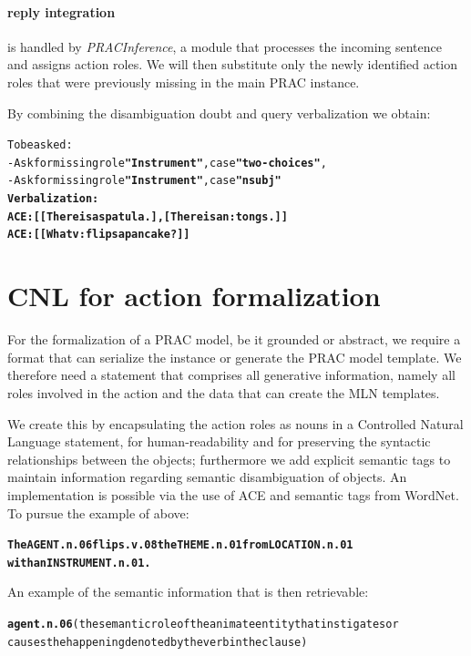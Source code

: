 \documentclass[oribibl]{llncs}
\begin{document}



\paragraph{reply integration} is handled by \textit{PRACInference}, a module that processes the incoming sentence and assigns action roles. We will then substitute only the newly identified action roles that were previously missing in the main PRAC instance.

By combining the disambiguation doubt and query verbalization we obtain:
\begin{alltt}
To be asked:
  - Ask for missing role \textbf{"Instrument"}, case \textbf{"two-choices"},
  - Ask for missing role \textbf{"Instrument"}, case \textbf{"nsubj"}  
\textbf{\color{red}
Verbalization: 
ACE: [[There is a spatula.],[There is a n:tongs.]]
ACE: [[What v:flips a pancake?]]
}
\end{alltt}
\section{CNL for action formalization}
For the formalization of a PRAC model, be it grounded or abstract, we require a format that can serialize the instance or generate the PRAC model template.
We therefore need a statement that comprises all generative information, namely all roles involved in the action and the data that can create the MLN templates.  

We create this by encapsulating the action roles as nouns in a Controlled Natural Language statement, for human-readability and for preserving the syntactic relationships between the objects; furthermore we add explicit semantic tags to maintain information regarding semantic disambiguation of objects.
An implementation is possible via the use of ACE and semantic tags from WordNet\cite{Miller95wordnet:a}. To pursue the example of above:
\begin{alltt}
\textbf{The AGENT.n.06 flips.v.08 the THEME.n.01 from LOCATION.n.01 \\with an INSTRUMENT.n.01.}
\end{alltt}
An example of the semantic information that is then retrievable:
{\small
\begin{alltt}
\textbf{agent.n.06} {\color{red}(the semantic role of the animate entity that instigates or 
causes the happening denoted by the verb in the clause)}
\end{alltt}}
\end{document}
